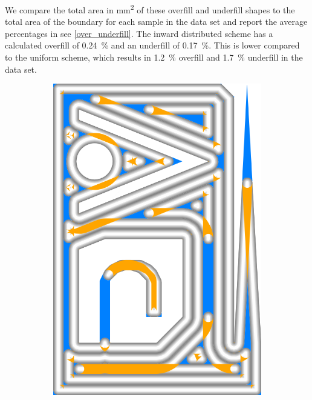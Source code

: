 We compare the total area in \si{\milli\meter\squared} of these overfill and underfill shapes to the total area of the boundary for each sample in the data set
and report the average percentages in see \cref{over_underfill}.
The inward distributed scheme has a calculated overfill of \SI{0.24}{\percent} and an underfill of \SI{0.17}{\percent}.
This is lower compared to the uniform scheme, which results in \SI{1.2}{\percent} overfill and \SI{1.7}{\percent} underfill in the data set.

\begin{figure}
\centering
\setlength{\figwidth}{0.19\textwidth}
\setlength{\figheight}{0.283\textwidth}
\begin{subfigure}{\figwidth}\centering
\includegraphics[height=\figheight]{sources-validation-gMAT-example-TEST-naive-accuracy.png}

\end{subfigure}
\end{figure}
